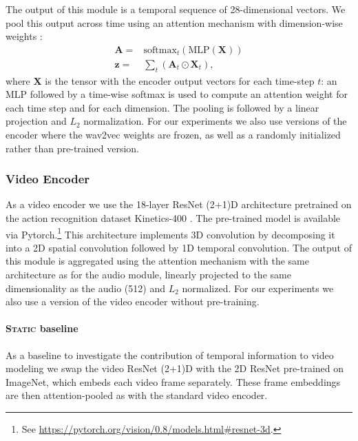 The output of this module is a temporal sequence of 28-dimensional vectors. We
pool this output across time using an attention mechanism with
dimension-wise weights \citep{Merkx2019}:
\begin{equation}
  \begin{aligned}
    \mathbf{A} = & \mathrm{softmax}_t\left(\mathrm{MLP}(\mathbf{X})\right)\\
    \mathbf{z} = & \sum_t \left( \mathbf{A}_{t} \odot \mathbf{X}_{t} \right),
  \end{aligned}
  \label{eq:att-pool}
\end{equation}
where $\mathbf{X}$ is the tensor with the encoder output vectors for
each time-step $t$: an MLP followed by a time-wise
softmax is used to compute an attention weight for each time step and for each
dimension.
The pooling is followed by a linear projection and $L_2$
normalization. For our experiments we also use versions of the encoder
where the wav2vec weights are frozen, as well as a randomly initialized
rather than pre-trained version.



\subsubsection{Video Encoder}
As a video encoder we use the 18-layer ResNet (2+1)D architecture
\citep{tran2018closer} pretrained on the action recognition dataset
Kinetics-400 \citep{DBLP:journals/corr/KayCSZHVVGBNSZ17}. The
pre-trained model is available via Pytorch.\footnote{See
  \url{https://pytorch.org/vision/0.8/models.html\#resnet-3d}.}  This
architecture implements 3D convolution by decomposing it into a 2D
spatial convolution followed by 1D temporal convolution.  The output
of this module is aggregated using the attention mechanism with the
same architecture as for the audio module, linearly projected to the
same dimensionality as the audio (512) and $L_2$ normalized.  For our
experiments we also use a version of the video encoder without
pre-training.

\paragraph{\textsc{Static} baseline}
As a baseline to investigate the contribution of temporal information to
video modeling we swap the video ResNet (2+1)D with the 2D ResNet
pre-trained on ImageNet, which embeds each video frame
separately. These frame embeddings are then attention-pooled as with
the standard video encoder. 

